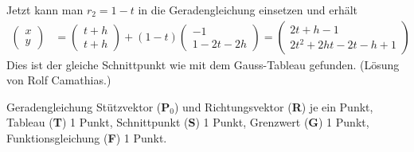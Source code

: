 \begin{loesung}
Jetzt kann man $r_2=1-t$ in die Geradengleichung einsetzen und erhält
\begin{align*}
\begin{pmatrix}x\\y \end{pmatrix}
&=
\begin{pmatrix}t+h\\t+h\end{pmatrix}
+(1-t)
\begin{pmatrix}-1\\1-2t-2h\end{pmatrix}
=
\begin{pmatrix}
2t+h-1\\
2t^2+2ht-2t-h+1
\end{pmatrix}
\end{align*}
Dies ist der gleiche Schnittpunkt wie mit dem Gauss-Tableau gefunden.
(Lösung von Rolf Camathias.)
\qedhere
\end{loesung}

\begin{bewertung}
Geradengleichung Stützvektor ({\bf P$_0$}) und Richtungsvektor ({\bf R})
je ein Punkt,
Tableau ({\bf T}) 1 Punkt, Schnittpunkt ({\bf S}) 1 Punkt,
Grenzwert ({\bf G}) 1 Punkt,
Funktionsgleichung ({\bf F}) 1 Punkt.
\end{bewertung}

